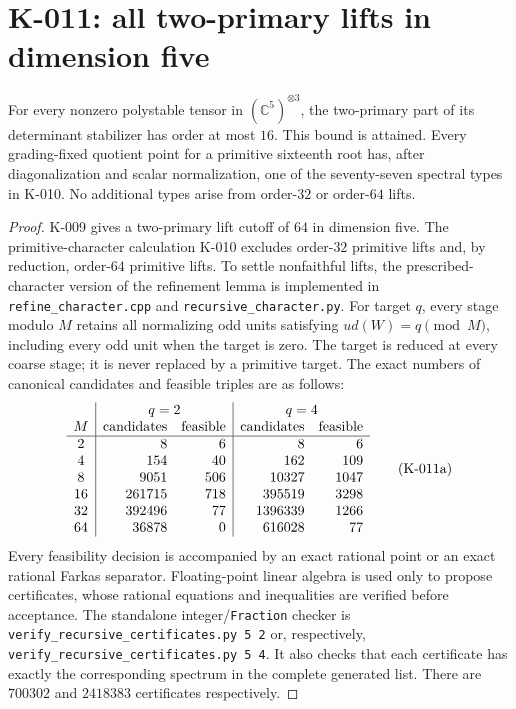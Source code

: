 \section{K-011: all two-primary lifts in dimension five}

\begin{theorem}[K-011]
For every nonzero polystable tensor in $(\mathbb C^5)^{\otimes3}$,
the two-primary part of its determinant stabilizer has order at most
$16$.  This bound is attained.  Every grading-fixed quotient point
for a primitive sixteenth root has, after diagonalization and scalar
normalization, one of the seventy-seven spectral types in K-010.
No additional types arise from order-$32$ or order-$64$ lifts.
\end{theorem}

\begin{proof}
K-009 gives a two-primary lift cutoff of $64$ in dimension five.
The primitive-character calculation K-010 excludes order-$32$
primitive lifts and, by reduction, order-$64$ primitive lifts.
To settle nonfaithful lifts, the prescribed-character version of the
refinement lemma is implemented in \texttt{refine\_character.cpp}
and \texttt{recursive\_character.py}.  For target $q$, every stage
modulo $M$ retains all normalizing odd units satisfying
$u d(W)=q\pmod M$, including every odd unit when the target is zero.
The target is reduced at every coarse stage; it is never replaced
by a primitive target.  The exact numbers of canonical candidates
and feasible triples are as follows:
\[
\begin{array}{c|rr|rr}
 &\multicolumn{2}{c|}{q=2}&\multicolumn{2}{c}{q=4}\\
 M&\text{candidates}&\text{feasible}&\text{candidates}&\text{feasible}\\\hline
 2&8&6&8&6\\
 4&154&40&162&109\\
 8&9051&506&10327&1047\\
 16&261715&718&395519&3298\\
 32&392496&77&1396339&1266\\
 64&36878&0&616028&77
\end{array}                                                   \tag{K-011a}
\]
Every feasibility decision is accompanied by an exact rational point
or an exact rational Farkas separator.  Floating-point linear algebra
is used only to propose certificates, whose rational equations and
inequalities are verified before acceptance.  The standalone
integer/\texttt{Fraction} checker is
\texttt{verify\_recursive\_certificates.py 5 2} or, respectively,
\texttt{verify\_recursive\_certificates.py 5 4}.  It also checks that
each certificate has exactly the corresponding spectrum in the
complete generated list.  There are $700302$ and $2418383$
certificates respectively.


\end{proof}
